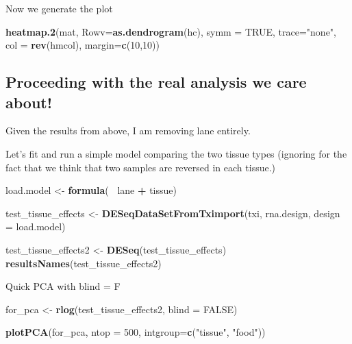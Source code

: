 \documentclass[
]{article}
\newenvironment{Shaded}{\begin{snugshade}}{\end{snugshade}}
\newcommand{\DataTypeTok}[1]{\textcolor[rgb]{0.13,0.29,0.53}{#1}}
\newcommand{\DecValTok}[1]{\textcolor[rgb]{0.00,0.00,0.81}{#1}}
\newcommand{\KeywordTok}[1]{\textcolor[rgb]{0.13,0.29,0.53}{\textbf{#1}}}
\newcommand{\NormalTok}[1]{#1}
\newcommand{\OperatorTok}[1]{\textcolor[rgb]{0.81,0.36,0.00}{\textbf{#1}}}
\newcommand{\OtherTok}[1]{\textcolor[rgb]{0.56,0.35,0.01}{#1}}
\newcommand{\StringTok}[1]{\textcolor[rgb]{0.31,0.60,0.02}{#1}}
\begin{document}
Now we generate the plot

\begin{Shaded}
\begin{Highlighting}[]
\KeywordTok{heatmap.2}\NormalTok{(mat, }\DataTypeTok{Rowv=}\KeywordTok{as.dendrogram}\NormalTok{(hc),}
          \DataTypeTok{symm =} \OtherTok{TRUE}\NormalTok{, }\DataTypeTok{trace=}\StringTok{"none"}\NormalTok{,}
          \DataTypeTok{col =} \KeywordTok{rev}\NormalTok{(hmcol), }\DataTypeTok{margin=}\KeywordTok{c}\NormalTok{(}\DecValTok{10}\NormalTok{,}\DecValTok{10}\NormalTok{))}
\end{Highlighting}
\end{Shaded}

\hypertarget{proceeding-with-the-real-analysis-we-care-about}{%
\subsection{Proceeding with the real analysis we care
about!}\label{proceeding-with-the-real-analysis-we-care-about}}

Given the results from above, I am removing lane entirely.

Let's fit and run a simple model comparing the two tissue types
(ignoring for the fact that we think that two samples are reversed in
each tissue.)

\begin{Shaded}
\begin{Highlighting}[]
\NormalTok{load.model <-}\StringTok{ }\KeywordTok{formula}\NormalTok{(}\OperatorTok{~}\StringTok{ }\NormalTok{lane }\OperatorTok{+}\StringTok{ }\NormalTok{tissue)}
\end{Highlighting}
\end{Shaded}

\begin{Shaded}
\begin{Highlighting}[]
\NormalTok{test_tissue_effects <-}\StringTok{ }\KeywordTok{DESeqDataSetFromTximport}\NormalTok{(txi,}
\NormalTok{  rna.design, }
  \DataTypeTok{design =}\NormalTok{ load.model)}

\NormalTok{test_tissue_effects2 <-}\StringTok{ }\KeywordTok{DESeq}\NormalTok{(test_tissue_effects)}
\KeywordTok{resultsNames}\NormalTok{(test_tissue_effects2)}
\end{Highlighting}
\end{Shaded}

Quick PCA with blind = F

\begin{Shaded}
\begin{Highlighting}[]
\NormalTok{for_pca <-}\StringTok{ }\KeywordTok{rlog}\NormalTok{(test_tissue_effects2, }
                \DataTypeTok{blind =} \OtherTok{FALSE}\NormalTok{)}

\KeywordTok{plotPCA}\NormalTok{(for_pca, }\DataTypeTok{ntop =} \DecValTok{500}\NormalTok{,}
        \DataTypeTok{intgroup=}\KeywordTok{c}\NormalTok{(}\StringTok{"tissue"}\NormalTok{, }\StringTok{"food"}\NormalTok{))}
\end{Highlighting}
\end{Shaded}
\end{document}
